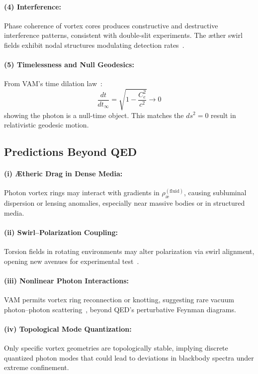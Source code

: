 \paragraph{(4) Interference:}
Phase coherence of vortex cores produces constructive and destructive interference patterns, consistent with double-slit experiments. The æther swirl fields exhibit nodal structures modulating detection rates~\cite{iskandarani2025c}.

\paragraph{(5) Timelessness and Null Geodesics:}
From VAM’s time dilation law~\cite{iskandarani2025b}:
\begin{equation}
    \frac{dt}{dt_\infty} = \sqrt{1 - \frac{C_e^2}{c^2}} \to 0
\end{equation}
showing the photon is a null-time object. This matches the $ds^2 = 0$ result in relativistic geodesic motion.

\subsection{Predictions Beyond QED}

\paragraph{(i) Ætheric Drag in Dense Media:}
Photon vortex rings may interact with gradients in $\rho_\text{\ae}^{(\text{fluid})}$, causing subluminal dispersion or lensing anomalies, especially near massive bodies or in structured media.

\paragraph{(ii) Swirl–Polarization Coupling:}
Torsion fields in rotating environments may alter polarization via swirl alignment, opening new avenues for experimental test~\cite{fedi2023, vanputten2022}.

\paragraph{(iii) Nonlinear Photon Interactions:}
VAM permits vortex ring reconnection or knotting, suggesting rare vacuum photon–photon scattering~\cite{battye1998}, beyond QED’s perturbative Feynman diagrams.

\paragraph{(iv) Topological Mode Quantization:}
Only specific vortex geometries are topologically stable, implying discrete quantized photon modes that could lead to deviations in blackbody spectra under extreme confinement.

